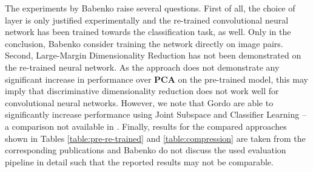 The experiments by Babenko \etal raise several questions. First of all, the choice of layer is only justified experimentally and the re-trained convolutional neural network has been trained towards the classification task, as well. Only in the conclusion, Babenko \etal consider training the network directly on image pairs. Second, Large-Margin Dimensionality Reduction has not been demonstrated on the re-trained neural network. As the approach does not demonstrate any significant increase in performance over \textbf{PCA} on the pre-trained model, this may imply that discriminative dimensionality reduction does not work well for convolutional neural networks. However, we note that Gordo \etal are able to significantly increase performance using Joint Subspace and Classifier Learning -- a comparison not available in \cite{BabenkoSlesarevChigorinLempitsky:2014}. Finally, results for the compared approaches shown in Tables \ref{table:pre-re-trained} and \ref{table:compression} are taken from the corresponding publications and Babenko \etal do not discuss the used evaluation pipeline in detail such that the reported results may not be comparable.
